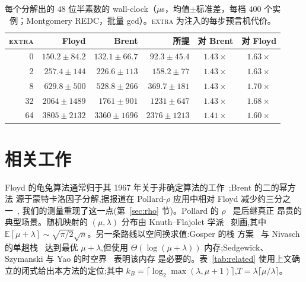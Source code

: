\documentclass[11pt]{ctexart}
\begin{document}
\begin{table}[H]\centering
\caption{每个分解出的 $48$ 位半素数的 wall-clock（$\mu$s，均值$\pm$标准差，每档 $400$ 个实例；Montgomery REDC，批量 gcd）。\textsc{extra} 为注入的每步预言机代价。}
\label{tab:rho-wallclock}
\begin{tabular}{rrrrcc}
\toprule
\textsc{extra} & Floyd & Brent & 所提 & 对 Brent & 对 Floyd\\
\midrule
0  & $150.2\pm84.2$ & $132.1\pm66.7$ & $92.3\pm45.4$ & $1.43\times$ & $1.63\times$\\
2  & $257.4\pm144$ & $226.6\pm113$ & $158.2\pm77$ & $1.43\times$ & $1.63\times$\\
8  & $629.8\pm500$ & $528.8\pm266$ & $369.7\pm181$ & $1.43\times$ & $1.70\times$\\
32 & $2064\pm1489$ & $1761\pm901$ & $1231\pm647$ & $1.43\times$ & $1.68\times$\\
64 & $3805\pm2132$ & $3360\pm1696$ & $2376\pm1213$ & $1.41\times$ & $1.60\times$\\
\bottomrule
\end{tabular}
\end{table}

\section{相关工作}
\label{sec:related}

Floyd 的龟兔算法通常归于其 1967 年关于非确定算法的工作~\cite{floyd1967};Brent 的二的幂方法
源于蒙特卡洛因子分解,据报道在 Pollard-$\rho$ 应用中相对 Floyd 减少约三分之一~\cite{brent1980},
我们的测量重现了这一点(第~\ref{sec:rho} 节)。Pollard 的 $\rho$~\cite{pollard1975} 是后继真正
昂贵的典型场景。随机映射的 $(\mu,\lambda)$ 分布由 Knuth--Flajolet 学派~\cite{flajolet,sedgewick2013}
刻画,其中 $\mathbb E[\mu+\lambda]\sim\sqrt{\pi/2}\sqrt n$。另一条路线以空间换求值:Gosper 的栈
方案~\cite{gosper1972} 与 Nivasch 的单趟栈~\cite{nivasch2004} 达到最优 $\mu+\lambda$,但使用
$\Theta(\log(\mu+\lambda))$ 内存;Sedgewick、Szymanski 与 Yao 的时空界~\cite{ssy1982} 表明该内存
是必要的。表~\ref{tab:related} 使用上文确立的闭式给出本方法的定位;其中
$k_B=\lceil\log_2\max(\lambda,\mu+1)\rceil$,$T=\lambda\lceil\mu/\lambda\rceil$。
\end{document}
